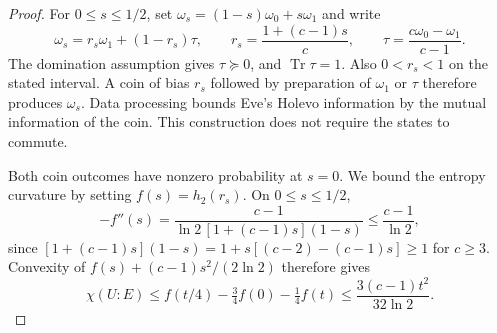 \documentclass[10pt,a4paper]{amsart}
\newcommand{\Tr}{\operatorname{Tr}}
\begin{document}
\begin{proof}
For $0\le s\le1/2$, set $\omega_s=(1-s)\omega_0+s\omega_1$ and write
\begin{equation}
    \omega_s=r_s\omega_1+(1-r_s)\tau,\qquad
    r_s=\frac{1+(c-1)s}{c},\qquad
    \tau=\frac{c\omega_0-\omega_1}{c-1}.
    \label{eq:coin}
\end{equation}
The domination assumption gives $\tau\succeq0$, and $\Tr\tau=1$.
Also $0<r_s<1$ on the stated interval. A coin of bias $r_s$ followed by
preparation of $\omega_1$ or $\tau$ therefore produces $\omega_s$.
Data processing bounds Eve's Holevo information by the mutual information
of the coin. This construction does not require the states to commute.

Both coin outcomes have nonzero probability at $s=0$. We bound the
entropy curvature by setting $f(s)=h_2(r_s)$. On $0\le s\le1/2$,
\begin{equation}
    -f''(s)=\frac{c-1}{\ln2\,[1+(c-1)s](1-s)}
    \le\frac{c-1}{\ln2},
    \label{eq:curvature}
\end{equation}
since $[1+(c-1)s](1-s)=1+s[(c-2)-(c-1)s]\ge1$ for $c\ge3$.
Convexity of $f(s)+(c-1)s^2/(2\ln2)$ therefore gives
\begin{equation}
    \chi(U:E)\le f(t/4)-\tfrac34 f(0)-\tfrac14 f(t)
    \le\frac{3(c-1)t^2}{32\ln2}.
    \label{eq:coin-bound}
\end{equation}
\end{proof}
\end{document}
